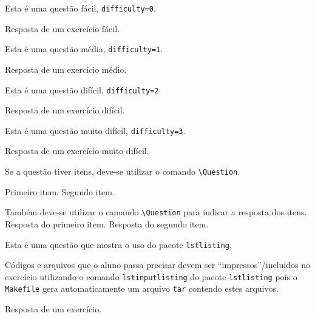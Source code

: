 \begin{Exercise}[label={easy}, difficulty=0]
  Esta é uma questão fácil, \lstinline+difficulty=0+.
\end{Exercise}
\begin{Answer}[ref={easy}]
  Resposta de um exercício fácil.
\end{Answer}

\begin{Exercise}[label={medium}, difficulty=1]
  Esta é uma questão média, \lstinline+difficulty=1+.
\end{Exercise}
\begin{Answer}[ref={medium}]
  Resposta de um exercício médio.
\end{Answer}

\begin{Exercise}[label={hard}, difficulty=2]
  Esta é uma questão difícil, \lstinline+difficulty=2+.
\end{Exercise}
\begin{Answer}[ref={hard}]
  Resposta de um exercício difícil.
\end{Answer}

\begin{Exercise}[label={veryhard}, difficulty=3]
  Esta é uma questão muito difícil, \lstinline+difficulty=3+.
\end{Exercise}
\begin{Answer}[ref={veryhard}]
  Resposta de um exercício muito difícil.
\end{Answer}

\begin{Exercise}[label={question}, difficulty=0]
  Se a questão tiver itens, deve-se utilizar o comando \lstinline+\Question+.

  \Question Primeiro item.
  \Question Segundo item.
\end{Exercise}
\begin{Answer}[ref={question}]
  Também deve-se utilizar o camando \lstinline+\Question+ para indicar a
  resposta dos itens.
  \Question Resposta do primeiro item.
  \Question Resposta do segundo item.
\end{Answer}

\begin{Exercise}[label={lstlisting}, difficulty=0]
  Esta é uma questão que mostra o uso do pacote \lstinline+lstlisting+.
  
  Códigos e arquivos que o aluno passa precisar devem ser
  ``impressos''/incluidos no exercício utilizando o comando
  \lstinline+lstinputlisting+ do pacote \lstinline+lstlisting+ pois o \lstinline+Makefile+ gera
  automaticamente um arquivo \lstinline+tar+ contendo estes arquivos.
\end{Exercise}
\begin{Answer}[ref={lstlisting}]
  Resposta de um exercício.
\end{Answer}

